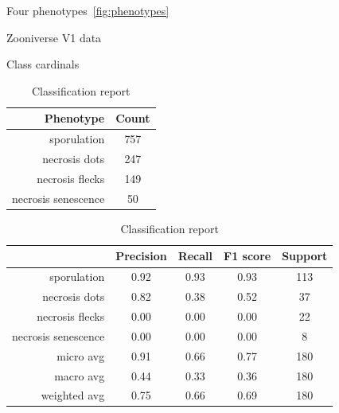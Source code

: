 \documentclass[english]{article}
\begin{document}
Four phenotypes~\ref*{fig:phenotypes}

\begin{table}[H]
	\caption{Zooniverse V1 data}\label{tab:zv1data}
	\begin{minipage}{0.4\linewidth}
		\caption{Class cardinals}\label{tab:zoonv1classcardinals}
		\begin{tabular}{rc}
			\toprule
			Phenotype           & Count \\
			\midrule
			sporulation         & 757   \\
			necrosis dots       & 247   \\
			necrosis flecks     & 149   \\
			necrosis senescence & 50    \\
			\bottomrule
		\end{tabular}
	\end{minipage}%
	\begin{minipage}{0.4\linewidth}
		\centering
		\caption{Classification report}\label{tab:zv1mcr}
		\begin{tabular}{rcccc}
			\toprule
			{}                                    & Precision & Recall & F1 score & Support \\
			\midrule
			sporulation                           & 0.92      & 0.93   & 0.93     & 113     \\
			necrosis dots                         & 0.82      & 0.38   & 0.52     & 37      \\
			\rowcolor{red!25} necrosis flecks     & 0.00      & 0.00   & 0.00     & 22      \\
			\rowcolor{red!25} necrosis senescence & 0.00      & 0.00   & 0.00     & 8       \\
			micro avg                             & 0.91      & 0.66   & 0.77     & 180     \\
			macro avg                             & 0.44      & 0.33   & 0.36     & 180     \\
			weighted avg                          & 0.75      & 0.66   & 0.69     & 180     \\
			\bottomrule
		\end{tabular}
	\end{minipage}
\end{table}
\end{document}
